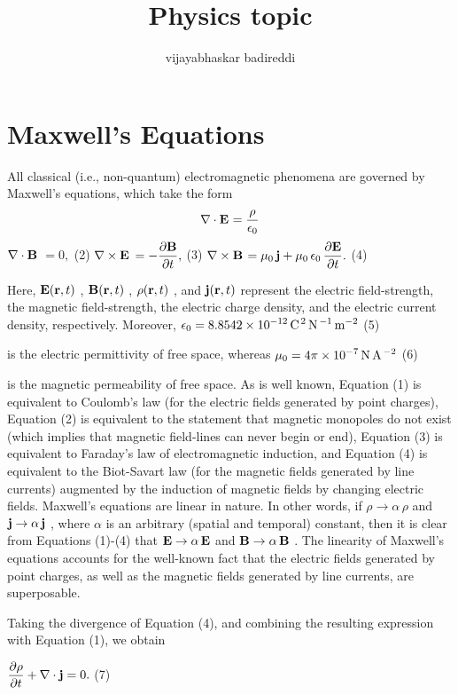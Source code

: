 \documentclass[12pt]{article}
\title{Physics topic}
\author{vijayabhaskar badireddi}
\date{}
\begin{document}
\section*{Maxwell's Equations}
All classical (i.e., non-quantum) electromagnetic phenomena are governed by Maxwell's equations, which take the form
\[ \nabla\cdot {\bf E}$	$\displaystyle =\frac{\rho}{\epsilon_0}\]
$\displaystyle \nabla\cdot{\bf B}$	$\displaystyle =0,$	(2)
$\displaystyle \nabla\times {\bf E}$	$\displaystyle = -\frac{\partial{\bf B}}{\partial t},$	(3)
$\displaystyle \nabla\times {\bf B}$	$\displaystyle =\mu_0\,{\bf j} + \mu_0\,\epsilon_0\,\frac{\partial {\bf E}}{\partial t}.$	(4)

Here, $ {\bf E}({\bf r},t)$ , $ {\bf B}({\bf r},t)$ , $ \rho({\bf r},t)$ , and $ {\bf j}({\bf r},t)$ represent the electric field-strength, the magnetic field-strength, the electric charge density, and the electric current density, respectively. Moreover,
$\displaystyle \epsilon_0 = 8.8542\times 10^{-12}\,{\rm C^{\,2}\,N^{\,-1}\,m^{-2}}$	(5)

is the electric permittivity of free space, whereas
$\displaystyle \mu_0 = 4\pi\times 10^{-7}\,{\rm N\,A^{\,-2}}$	(6)

is the magnetic permeability of free space. As is well known, Equation (1) is equivalent to Coulomb's law (for the electric fields generated by point charges), Equation (2) is equivalent to the statement that magnetic monopoles do not exist (which implies that magnetic field-lines can never begin or end), Equation (3) is equivalent to Faraday's law of electromagnetic induction, and Equation (4) is equivalent to the Biot-Savart law (for the magnetic fields generated by line currents) augmented by the induction of magnetic fields by changing electric fields.
Maxwell's equations are linear in nature. In other words, if $ \rho\rightarrow \alpha\,\rho$ and $ {\bf j} \rightarrow \alpha\,{\bf j}$ , where $ \alpha$ is an arbitrary (spatial and temporal) constant, then it is clear from Equations (1)-(4) that $ {\bf E}\rightarrow \alpha\, {\bf E}$ and $ {\bf B}\rightarrow \alpha\, {\bf B}$ . The linearity of Maxwell's equations accounts for the well-known fact that the electric fields generated by point charges, as well as the magnetic fields generated by line currents, are superposable.

Taking the divergence of Equation (4), and combining the resulting expression with Equation (1), we obtain

 $\displaystyle \frac{\partial \rho}{\partial t} + \nabla\cdot{\bf j} = 0.$	(7)
\end{document}
